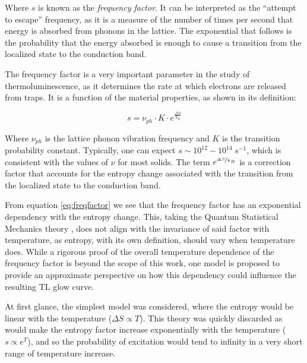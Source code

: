 \vspace{10pt}
Where $s$ is known as the \textit{frequency factor}. It can be interpreted as the ``attempt to escape'' frequency, as it is a measure of the number of times per second that energy is absorbed from phonons in the lattice. The exponential that follows is the probability that the energy absorbed is enough to cause a transition from the localized state to the conduction band. 

\vspace{10pt}

The frequency factor is a very important parameter in the study of thermoluminescence, as it determines the rate at which electrons are released from traps. It is a function of the material properties, as shown in its definition:

\begin{equation} \label{eq:freqfactor}
  s = \nu_{ph} \cdot K \cdot e^{\frac{\Delta S}{k_B}}
\end{equation}

\vspace{10pt}
Where $\nu_{ph}$ is the lattice phonon vibration frequency and $K$ is the transition probability constant. Typically, one can expect $s \sim 10^{12} -10^{14}$ s$^{-1}$, which is consistent with the values of $\nu$ for most solids. The term $e^{\nicefrac{\Delta S}{k_B}}$ is a correction factor that accounts for the entropy change associated with the transition from the localized state to the conduction band. 

\vspace{10pt}

From equation \ref{eq:freqfactor} we see that the frequency factor has an exponential dependency with the entropy change. This, taking the Quantum Statistical Mechanics theory \cite{brey}, does not align with the invariance of said factor with temperature, as entropy, with its own definition, should vary when temperature does. While a rigorous proof of the overall temperature dependence of the frequency factor is beyond the scope of this work, one model is proposed to provide an approximate perspective on how this dependency could influence the resulting TL glow curve. 

\vspace{10pt}

At first glance, the simplest model was considered, where the entropy would be linear with the temperature ($\Delta S \propto T$). This theory was quickly discarded as would make the entropy factor increase exponentially with the temperature ($s \propto e^T$), and so the probability of excitation would tend to infinity in a very short range of temperature increase.

